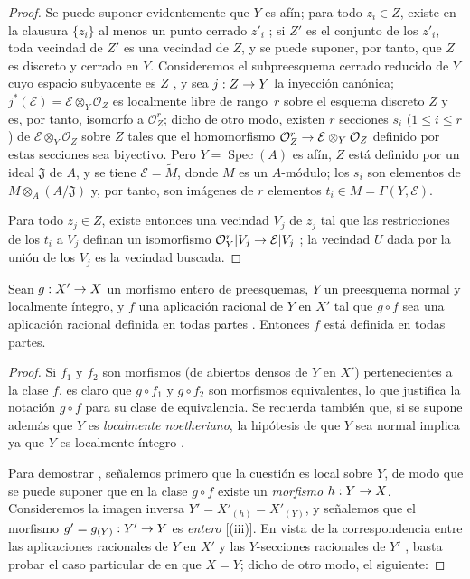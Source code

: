 \documentclass[oneside,10pt]{amsart}
\makeatletter
\renewcommand{\leq}{\leqslant}
\newcommand{\ega@arrow}[2]{\mathchoice{#1}{#2}{#2}{#2}}
\renewcommand{\to}{\ega@arrow{\longrightarrow}{\rightarrow}}
\newcommand{\oldpage}[2][]{\marginnote{\normalfont\footnotesize\textbf{#1}~|~#2}\ignorespaces}
\let\EGAOriginalLabel\label
\renewcommand{\label}[1]{\phantomsection\EGAOriginalLabel{#1}}
\makeatother
\begin{document}
\begin{proof}
Se puede suponer evidentemente que $Y$ es afín;
para todo $z_i\in Z$, existe en la clausura $\overline{\{z_i\}}$ al menos un punto cerrado $z'_i$ ;
si $Z'$ es el conjunto de los $z'_i$, toda vecindad de $Z'$ es una vecindad de $Z$, y se puede suponer, por tanto, que $Z$ es discreto y cerrado en $Y$.
Consideremos el subpreesquema cerrado reducido de $Y$ cuyo espacio subyacente es $Z$ , y sea $j:Z\to Y$ la inyección canónica;
$j^*(\mathcal{E})=\mathcal{E}\otimes_Y
\mathcal{O}_Z$ es localmente libre de rango~$r$ sobre el esquema discreto $Z$ y es, por tanto, isomorfo a $\mathcal{O}_Z^r$;
dicho de otro modo, existen $r$ secciones $s_i$ ($1\leq i\leq r$) de $\mathcal{E}\otimes_Y\mathcal{O}_Z$ sobre $Z$ tales que el homomorfismo $\mathcal{O}_Z^r\to\mathcal{E}\otimes_Y\mathcal{O}_Z$ definido por estas secciones sea biyectivo.
Pero $Y=\operatorname{Spec}(A)$ es afín, $Z$ está definido por un ideal $\mathfrak{J}$ de $A$, y se tiene $\mathcal{E}=\widetilde{M}$, donde $M$ es un $A$-módulo;
los $s_i$ son elementos 
\oldpage[II]{114}
de $M\otimes_A(A/\mathfrak{J})$ y, por tanto, son imágenes de $r$ elementos $t_i\in M=\Gamma(Y,\mathcal{E})$.

Para todo $z_j\in Z$, existe entonces una vecindad $V_j$ de $z_j$ tal que las restricciones de los $t_i$ a $V_j$ definan un isomorfismo $\mathcal{O}_Y^r|V_j\to\mathcal{E}|V_j$ ;
la vecindad $U$ dada por la unión de los $V_j$ es la vecindad buscada.
\end{proof}

\begin{proposition}[6.1.13]
\label{II.6.1.13-fr}
Sean $g:X'\to X$ un morfismo entero de preesquemas, $Y$ un preesquema normal y localmente íntegro, y $f$ una aplicación racional de $Y$ en $X'$ tal que $g\circ f$ sea una aplicación racional definida en todas partes \textup{}.
Entonces $f$ está definida en todas partes.
\end{proposition}

\begin{proof}
Si $f_1$ y $f_2$ son morfismos (de abiertos densos de $Y$ en $X'$) pertenecientes a la clase $f$, es claro que $g\circ f_1$ y $g\circ f_2$ son morfismos equivalentes, lo que justifica la notación $g\circ f$ para su clase de equivalencia.
Se recuerda también que, si se supone además que $Y$ es \emph{localmente noetheriano}, la hipótesis de que $Y$ sea normal implica ya que $Y$ es localmente íntegro .

Para demostrar , señalemos primero que la cuestión es local sobre $Y$, de modo que se puede suponer que en la clase $g\circ f$ existe un \emph{morfismo} $h:Y\to X$.
Consideremos la imagen inversa $Y'=X'_{(h)}=X'_{(Y)}$, y señalemos que el morfismo $g'=g_{(Y)}:Y'\to Y$ es \emph{entero} [(iii)].
En vista de la correspondencia entre las aplicaciones racionales de $Y$ en $X'$ y las $Y$-secciones racionales de $Y'$ , basta probar el caso particular de  en que $X=Y$; dicho de otro modo, el siguiente:
\end{proof}
\end{document}
